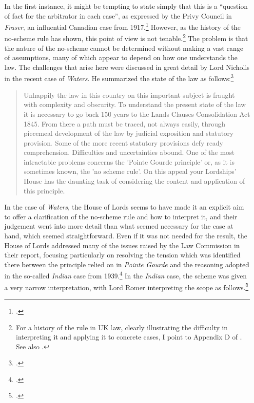 In the first instance, it might be tempting to state simply that this is a ``question of fact for the arbitrator in each case'', as expressed by the Privy Council in \emph{Fraser}, an influential Canadian case from 1917.\footnote{\cite[194]{fraser17}.} However, as the history of the no-scheme rule has shown, this point of view is not tenable.\footnote{For a history of the rule in UK law, clearly illustrating the difficulty in interpreting it and applying it to concrete cases, I point to Appendix D of \cite{lawcom03}. See also \cite{lawcom01}.}  The problem is that the nature of the no-scheme cannot be determined without making a vast range of assumptions, many of which appear to depend on how one understands the law. The challenges that arise here were discussed in great detail by Lord Nicholls in the recent case of \emph{Waters}. He summarized the state of the law as follows:\footnote{\cite[19]{waters04}.}

\begin{quote}
Unhappily the law in this country on this important subject is fraught with complexity and obscurity. To understand the present state of the law it is necessary to go back 150 years to the Lands Clauses Consolidation Act 1845. From there a path must be traced, not always easily, through piecemeal development of the law by judicial exposition and statutory provision. Some of the more recent statutory provisions defy ready comprehension. Difficulties and uncertainties abound. One of the most intractable problems concerns the 'Pointe Gourde principle' or, as it is sometimes known, the 'no scheme rule'. On this appeal your Lordships' House has the daunting task of considering the content and application of this principle.
\end{quote}

In the case of \emph{Waters}, the House of Lords seems to have made it an explicit aim to offer a clarification of the no-scheme rule and how to interpret it, and their judgement went into more detail than what seemed necessary for the case at hand, which seemed straightforward. Even if it was not needed for the result, the House of Lords addressed many of the issues raised by the Law Commission in their report, focusing particularly on resolving the tension which was identified there between the principle relied on in \emph{Pointe Gourde} and the reasoning adopted in the so-called \emph{Indian} case from 1939.\footnote{\cite{indian39}.} In the \emph{Indian} case, the scheme was given a very narrow interpretation, with Lord Romer interpreting the scope as follows.\footcite[319]{indian39}

